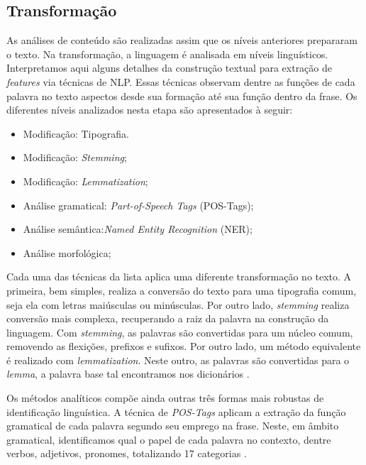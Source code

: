 \subsection{Transformação}
\label{subsec-transformacao}

As análises de conteúdo são realizadas assim que os níveis anteriores prepararam o texto. Na transformação, a linguagem é analisada em níveis linguísticos. Interpretamos aqui alguns detalhes da construção textual para extração de \textit{features} via técnicas de NLP. Essas técnicas observam dentre as funções de cada palavra no texto aspectos desde sua formação até sua função dentro da frase. Os diferentes níveis analizados nesta etapa são apresentados à seguir:

\begin{itemize}
	\item Modificação: Tipografia.
	\item Modificação: \textit{Stemming};
	\item Modificação: \textit{Lemmatization};
	\item Análise gramatical: \textit{Part-of-Speech Tags} (POS-Tags);
	\item Análise semântica:\textit{Named Entity Recognition} (NER);
	\item Análise morfológica;
\end{itemize}

Cada uma das técnicas da lista aplica uma diferente transformação no texto. A primeira, bem simples, realiza a conversão do texto para uma tipografia comum, seja ela com letras maiúsculas ou minúsculas. Por outro lado, \textit{stemming} realiza conversão mais complexa, recuperando a raiz da palavra na construção da linguagem. Com \textit{stemming}, as palavras são convertidas para um núcleo comum, removendo as flexições, prefixos e sufixos. Por outro lado, um método equivalente é realizado com \textit{lemmatization}. Neste outro, as palavras são convertidas para o \textit{lemma}, a palavra base tal encontramos nos dicionários \cite{baeza2011}. 

Os métodos analíticos compõe ainda outras três formas mais robustas de identificação linguística. A técnica de \textit{POS-Tags} aplicam a extração da função gramatical de cada palavra segundo seu emprego na frase. Neste, em âmbito gramatical, identificamos qual o papel de cada palavra no contexto, dentre verbos, adjetivos, pronomes, totalizando 17 categorias \cite{marneffe2021}.

